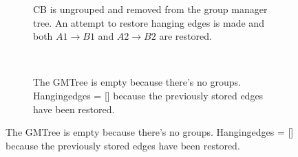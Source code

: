 \begin{figure}[H]
  \begin{subfigure}[t]{0.5\textwidth}
    \centering
    \renewcommand\thesubfigure{E1}
    \caption{CB is ungrouped and removed from the group manager tree. An attempt to restore hanging edges is made and both $A1\rightarrow B1$ and $A2\rightarrow B2$ are restored.}
  \end{subfigure}
  ~
  \begin{subfigure}[t]{0.5\textwidth}
    \centering
    \renewcommand\thesubfigure{E2}
    \caption{The GMTree is empty because there's no groups. Hangingedges = [] because the previously stored edges have been restored.}
  \end{subfigure}
\end{figure}
